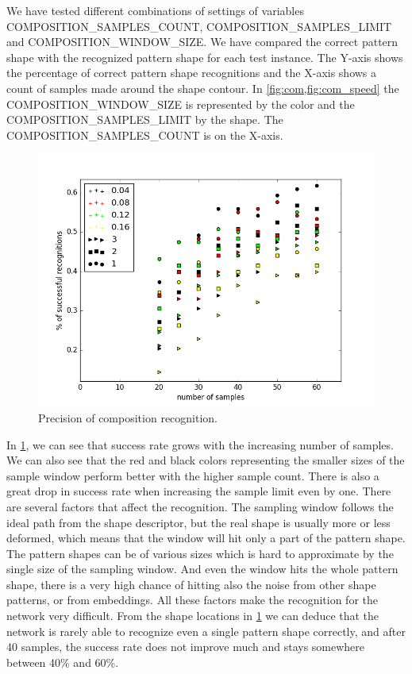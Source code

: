 \begin{description}
\begin{description}
We have tested different combinations of settings of variables COMPOSITION\_SAMPLES\_COUNT, COMPOSITION\_SAMPLES\_LIMIT and COMPOSITION\_WINDOW\_SIZE. We have compared the correct pattern shape with the recognized pattern shape for each test instance. The Y-axis shows the percentage of correct pattern shape recognitions and the X-axis shows a count of samples made around the shape contour. In \cref{fig:com,fig:com_speed} the COMPOSITION\_WINDOW\_SIZE is represented by the color and the COMPOSITION\_SAMPLES\_LIMIT by the shape. The COMPOSITION\_SAMPLES\_COUNT is on the X-axis. 
\begin{figure}
\centering
\includegraphics[width=.8\linewidth]{ext/figure_composition.png}
\caption{Precision of composition recognition. }
\label{fig:com}
\end{figure}

In \cref{fig:com}, we can see that success rate grows with the increasing number of samples. We can also see that the red and black colors representing the smaller sizes of the sample window perform better with the higher sample count. There is also a great drop in success rate when increasing the sample limit even by one. There are several factors that affect the recognition. The sampling window follows the ideal path from the shape descriptor, but the real shape is usually more or less deformed, which means that the window will hit only a part of the pattern shape. The pattern shapes can be of various sizes which is hard to approximate by the single size of the sampling window. And even the window hits the whole pattern shape, there is a very high chance of hitting also the noise from other shape patterns, or from embeddings. All these factors make the recognition for the network very difficult. From the shape locations in \cref{fig:com} we can deduce that the network is rarely able to recognize even a single pattern shape correctly, and after 40 samples, the success rate does not improve much and stays somewhere between 40\% and 60\%.


\end{description}
\end{description}
